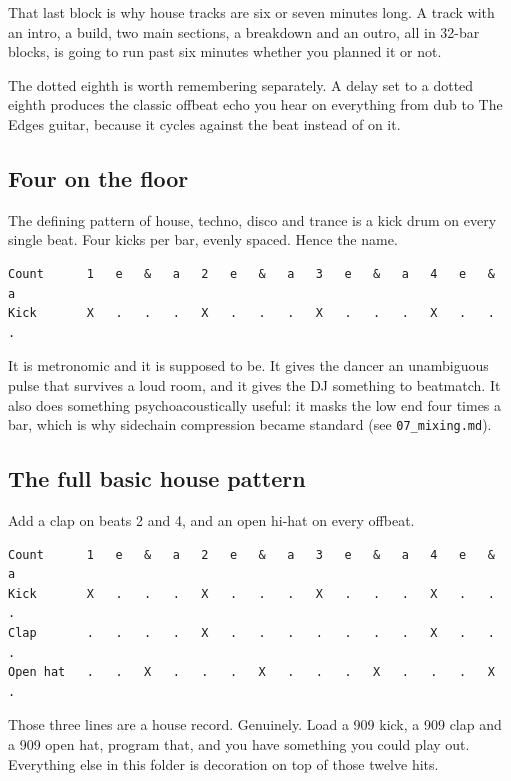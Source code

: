 That last block is why house tracks are six or seven minutes long. A track with an intro, a
build, two main sections, a breakdown and an outro, all in 32-bar blocks, is going to run
past six minutes whether you planned it or not.

The dotted eighth is worth remembering separately. A delay set to a dotted eighth produces
the classic offbeat echo you hear on everything from dub to The Edge\textquotesingle s guitar, because it
cycles against the beat instead of on it.

\subsection{Four on the floor}\label{th03_rhythm-four-on-the-floor}

The defining pattern of house, techno, disco and trance is a kick drum on every single
beat. Four kicks per bar, evenly spaced. Hence the name.

\begin{verbatim}
Count      1   e   &   a   2   e   &   a   3   e   &   a   4   e   &   a
Kick       X   .   .   .   X   .   .   .   X   .   .   .   X   .   .   .
\end{verbatim}

It is metronomic and it is supposed to be. It gives the dancer an unambiguous pulse that
survives a loud room, and it gives the DJ something to beatmatch. It also does something
psychoacoustically useful: it masks the low end four times a bar, which is why sidechain
compression became standard (see \texttt{07\_mixing.md}).

\subsection{The full basic house pattern}\label{th03_rhythm-the-full-basic-house-pattern}

Add a clap on beats 2 and 4, and an open hi-hat on every offbeat.

\begin{verbatim}
Count      1   e   &   a   2   e   &   a   3   e   &   a   4   e   &   a
Kick       X   .   .   .   X   .   .   .   X   .   .   .   X   .   .   .
Clap       .   .   .   .   X   .   .   .   .   .   .   .   X   .   .   .
Open hat   .   .   X   .   .   .   X   .   .   .   X   .   .   .   X   .
\end{verbatim}

Those three lines are a house record. Genuinely. Load a 909 kick, a 909 clap and a 909 open
hat, program that, and you have something you could play out. Everything else in this
folder is decoration on top of those twelve hits.

